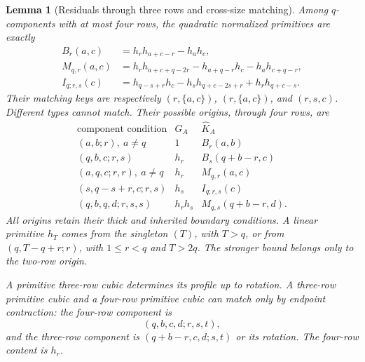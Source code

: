 \documentclass[11pt,a4paper]{amsart}
\numberwithin{equation}{section}
\theoremstyle{plain}
\newtheorem{lemma}[theorem]{Lemma}
\theoremstyle{definition}
\begin{document}
\begin{lemma}[Residuals through three rows and cross-size matching]
\label{lem:staircase-small-residuals}
Among \(q\)-components with at most four rows, the quadratic normalized
primitives are exactly
\begin{align*}
 B_r(a,c)&=h_rh_{a+c-r}-h_ah_c,\\
 M_{q,r}(a,c)&=h_rh_{a+c+q-2r}
              -h_{a+q-r}h_c-h_ah_{c+q-r},\\
 I_{q;r,s}(c)&=h_{q-s+r}h_c
              -h_sh_{q+c-2s+r}+h_rh_{q+c-s}.
\end{align*}
Their matching keys are respectively \((r,\{a,c\})\),
\((r,\{a,c\})\), and \((r,s,c)\).  Different types cannot match.
Their possible origins, through four rows, are
\[
\begin{array}{c|c|c}
\text{component condition}&G_A&\widehat K_A\\\hline
(a,b;r),\ a\ne q&1&B_r(a,b)\\
(q,b,c;r,s)&h_r&B_s(q+b-r,c)\\
(a,q,c;r,r),\ a\ne q&h_r&M_{q,r}(a,c)\\
(s,q-s+r,c;r,s)&h_s&I_{q;r,s}(c)\\
(q,b,q,d;r,s,s)&h_rh_s&M_{q,s}(q+b-r,d).
\end{array}
\]
All origins retain their thick and inherited boundary conditions.
A linear primitive \(h_T\) comes from the singleton \((T)\), with
\(T>q\), or from \((q,T-q+r;r)\), with \(1\le r<q\) and
\(T>2q\).  The stronger bound belongs only to the two-row origin.

A primitive three-row cubic determines its profile up to rotation.
A three-row primitive cubic and a four-row primitive cubic can match
only by endpoint contraction: the four-row component is
\[
 (q,b,c,d;r,s,t),
\]
and the three-row component is
\((q+b-r,c,d;s,t)\) or its rotation.  The four-row content is \(h_r\).
\end{lemma}
\end{document}
